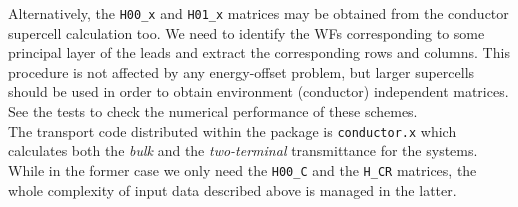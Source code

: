 Alternatively, the {\tt H00\_x} and {\tt H01\_x} matrices may be
obtained from the conductor supercell calculation too. We need to
identify the WFs corresponding to some principal layer of the
leads and extract the corresponding rows and columns. This
procedure is not affected by any energy-offset problem, but larger
supercells should be used in order to obtain environment
(conductor) independent matrices. See the tests to check the
numerical performance of these schemes.
%
\\

\noindent The transport code distributed within the \WANT package is
{\tt conductor.x} which calculates both the
{\em bulk} and the {\em two-terminal} transmittance for the systems.
While in the former case we
only need the {\tt H00\_C} and the {\tt H\_CR} matrices, the whole complexity
of input data described above is managed in the latter.

